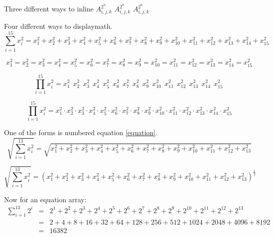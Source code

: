 \documentclass[12pt,a4paper]{article}
\theoremstyle{clearprint}
\begin{document}
\noindent 
Three different ways to inline \begin{math}A_{i,j,k}^{2^n}\end{math} \(A_{i,j,k}^{2^n}\) $A_{i,j,k}^{2^n}$

\noindent 
Four different ways to displaymath.
\setcounter{equation}{99}
\begin{equation}\label{equation}
\sum_{i=1}^{15} x_i^2 = x_1^2 + x_2^2 + x_3^2 + x_4^2 + x_5^2 + x_6^2 + x_7^2 + x_8^2 + x_9^2 + x_{10}^2 + x_{11}^2 + x_{12}^2 + x_{13}^2 + x_{14}^2 + x_{15}^2 
\end{equation}

\noindent 
\begin{displaymath}
x_1^2 = x_2^2 = x_3^2 = x_4^2 = x_5^2 = x_6^2 = x_7^2 = x_8^2 = x_9^2 = x_{10}^2 = x_{11}^2 = x_{12}^2 = x_{13}^2 = x_{14}^2 = x_{15}^2 
\end{displaymath}

\noindent 
\[
\prod_{i=1}^{15} x_i^2 = x_1^2\ \ x_2^2\ \ x_3^2\ \ x_4^2\ \ x_5^2\ \ x_6^2\ \ x_7^2\ \ x_8^2\ \ x_9^2\ \ x_{10}^2\ \ x_{11}^2\ \ x_{12}^2\ \ x_{13}^2\ \ x_{14}^2\ \ x_{15}^2\ 
\]

\noindent 
$$
\prod_{i=1}^{15} x_i^2 = x_1^2 \cdot x_2^2 \cdot x_3^2 \cdot x_4^2 \cdot x_5^2 \cdot x_6^2 \cdot x_7^2 \cdot x_8^2 \cdot x_9^2 \cdot x_{10}^2 \cdot x_{11}^2 \cdot x_{12}^2 \cdot x_{13}^2 \cdot x_{14}^2 \cdot x_{15}^2 
$$

\noindent 
One of the forms is numbered equation \ref{equation}.
\[
\sqrt{\sum_{i=1}^{13} x_i^2} = \sqrt{x_1^2 + x_2^2 + x_3^2 + x_4^2 + x_5^2 + x_6^2 + x_7^2 + x_8^2 + x_9^2 + x_{10}^2+ x_{11}^2 + x_{12}^2 + x_{13}^2 }
\]

\noindent 
\[
\sqrt{\sum_{i=1}^{13} x_i^2} = \left(x_1^2 + x_2^2 + x_3^2 + x_4^2 + x_5^2 + x_6^2 + x_7^2 + x_8^2 + x_9^2 + x_{10}^2+ x_{11}^2 + x_{12}^2 + x_{13}^2 \right)^{\frac{1}{2}}
\]

\noindent 
Now for an equation array:
\begin{eqnarray}\label{eqnarrayref}
\sum_{i=1}^{13} 2^i &=& 2^1 + 2^2 + 2^3 + 2^4 + 2^5 + 2^6 + 2^7 + 2^8 + 2^9 + 2^{10} + 2^{11} + 2^{12} + 2^{13}\nonumber\\
&=&2 + 4 + 8 + 16 + 32 + 64 + 128 + 256 + 512 + 1024 + 2048 + 4096 + 8192 \nonumber\\
&=&16382 
\end{eqnarray}
\end{document}
